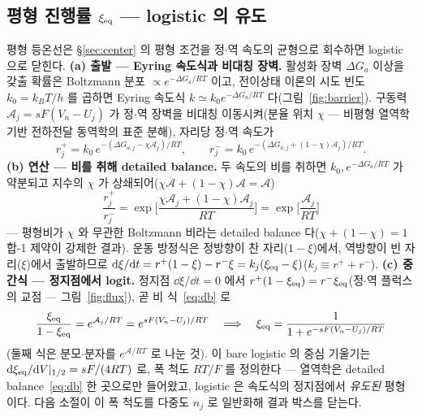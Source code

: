 \subsection{평형 진행률 $\xi_{\mathrm{eq}}$ --- logistic 의 유도}\label{sec:width-logistic}
평형 등온선은 \S\ref{sec:center} 의 평형 조건을 정$\cdot$역 속도의 균형으로 회수하면 logistic 으로 닫힌다.
\textbf{(a) 출발 --- Eyring 속도식과 비대칭 장벽.} 활성화 장벽 $\Delta G_a$ 이상을 갖출 확률은 Boltzmann 분포
$\propto e^{-\Delta G_a/RT}$ 이고, 전이상태 이론의 시도 빈도 $k_0=k_BT/h$ 를 곱하면 Eyring 속도식
$k\simeq k_0e^{-\Delta G_a/RT}$ 다(그림~\ref{fig:barrier})\cite{eyring1935}. 구동력 $\mathcal A_j=sF(V_n-U_j)$ 가 정$\cdot$역 장벽을
비대칭 이동시켜(분율 위치 $\chi$ --- 비평형 열역학 기반 전하전달 동역학의 표준 분해\cite{bazant2013}), 자리당 정$\cdot$역 속도가
\begin{equation}
r_j^+=k_0\,e^{-(\Delta G_{a,j}-\chi\mathcal A_j)/RT},\qquad
r_j^-=k_0\,e^{-(\Delta G_{a,j}+(1-\chi)\mathcal A_j)/RT}.
\label{eq:bv}
\end{equation}
\textbf{(b) 연산 --- 비를 취해 detailed balance.} 두 속도의 비를 취하면 $k_0,e^{-\Delta G_a/RT}$ 가 약분되고 지수의
$\chi$ 가 상쇄되어($\chi\mathcal A+(1-\chi)\mathcal A=\mathcal A$)
\begin{equation}
\frac{r_j^+}{r_j^-}=\exp\!\Big[\frac{\chi\mathcal A_j+(1-\chi)\mathcal A_j}{RT}\Big]=\exp\!\Big[\frac{\mathcal A_j}{RT}\Big]
\label{eq:db}
\end{equation}
--- 평형비가 $\chi$ 와 무관한 Boltzmann 비라는 detailed balance 다($\chi+(1-\chi)=1$ 합-1 제약이 강제한 결과). 운동
방정식은 정방향이 찬 자리($1-\xi$)에서, 역방향이 빈 자리($\xi$)에서 출발하므로
$\mathrm{d}\xi/\mathrm{d} t=r^+(1-\xi)-r^-\xi=k_j(\xi_{\mathrm{eq}}-\xi)$($k_j\equiv r^++r^-$). \textbf{(c) 중간식 --- 정지점에서 logit.}
정지점 $\dd\xi/\dd t=0$ 에서 $r^+(1-\xi_{\mathrm{eq}})=r^-\xi_{\mathrm{eq}}$(정$\cdot$역 플럭스의 교점 --- 그림~\ref{fig:flux}), 곧
비 식~\eqref{eq:db} 로
\begin{equation}
\frac{\xi_{\mathrm{eq}}}{1-\xi_{\mathrm{eq}}}=e^{\mathcal A_j/RT}=e^{sF(V_n-U_j)/RT}
\quad\Longrightarrow\quad
\xi_{\mathrm{eq}}=\frac{1}{1+e^{-sF(V_n-U_j)/RT}}
\label{eq:logisticsolve}
\end{equation}
(둘째 식은 분모$\cdot$분자를 $e^{\mathcal A/RT}$ 로 나눈 것). 이 bare logistic 의 중심 기울기는
$\mathrm{d}\xi_{\mathrm{eq}}/\mathrm{d} V|_{1/2}=sF/(4RT)$ 로, 폭 척도 $RT/F$ 를 정의한다 --- 열역학은 detailed balance~\eqref{eq:db}
한 곳으로만 들어왔고, logistic 은 속도식의 정지점에서 \emph{유도된} 평형이다. 다음 소절이 이 폭 척도를 다중도
$n_j$ 로 일반화해 결과 박스를 닫는다.

